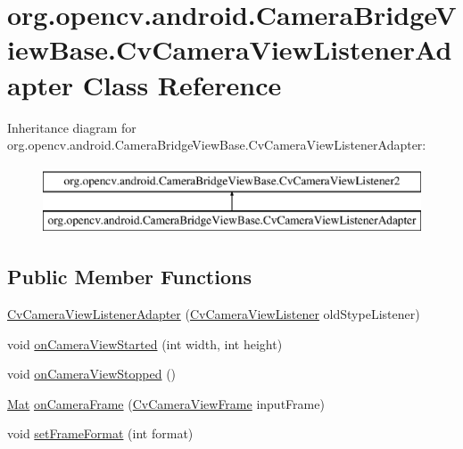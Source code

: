 \hypertarget{classorg_1_1opencv_1_1android_1_1_camera_bridge_view_base_1_1_cv_camera_view_listener_adapter}{}\section{org.\+opencv.\+android.\+Camera\+Bridge\+View\+Base.\+Cv\+Camera\+View\+Listener\+Adapter Class Reference}
\label{classorg_1_1opencv_1_1android_1_1_camera_bridge_view_base_1_1_cv_camera_view_listener_adapter}
Inheritance diagram for org.\+opencv.\+android.\+Camera\+Bridge\+View\+Base.\+Cv\+Camera\+View\+Listener\+Adapter\+:\begin{figure}[H]
\begin{center}
\leavevmode
\includegraphics[height=2.000000cm]{classorg_1_1opencv_1_1android_1_1_camera_bridge_view_base_1_1_cv_camera_view_listener_adapter}
\end{center}
\end{figure}
\subsection*{Public Member Functions}
\begin{DoxyCompactItemize}
\item 
\mbox{\hyperlink{classorg_1_1opencv_1_1android_1_1_camera_bridge_view_base_1_1_cv_camera_view_listener_adapter_ae7da6dbcb9eae36397b99a23194f1d0b}{Cv\+Camera\+View\+Listener\+Adapter}} (\mbox{\hyperlink{interfaceorg_1_1opencv_1_1android_1_1_camera_bridge_view_base_1_1_cv_camera_view_listener}{Cv\+Camera\+View\+Listener}} old\+Stype\+Listener)
\item 
void \mbox{\hyperlink{classorg_1_1opencv_1_1android_1_1_camera_bridge_view_base_1_1_cv_camera_view_listener_adapter_ac3c80b8f6b63af5c9f0e0239afb0ea92}{on\+Camera\+View\+Started}} (int width, int height)
\item 
void \mbox{\hyperlink{classorg_1_1opencv_1_1android_1_1_camera_bridge_view_base_1_1_cv_camera_view_listener_adapter_aadb52c2d31eddad60a8d5295f66fe76e}{on\+Camera\+View\+Stopped}} ()
\item 
\mbox{\hyperlink{classorg_1_1opencv_1_1core_1_1_mat}{Mat}} \mbox{\hyperlink{classorg_1_1opencv_1_1android_1_1_camera_bridge_view_base_1_1_cv_camera_view_listener_adapter_a8e7517c94e210a4bd3176ae681babc4b}{on\+Camera\+Frame}} (\mbox{\hyperlink{interfaceorg_1_1opencv_1_1android_1_1_camera_bridge_view_base_1_1_cv_camera_view_frame}{Cv\+Camera\+View\+Frame}} input\+Frame)
\item 
void \mbox{\hyperlink{classorg_1_1opencv_1_1android_1_1_camera_bridge_view_base_1_1_cv_camera_view_listener_adapter_a2e6b240e68884aff91670c5d98614180}{set\+Frame\+Format}} (int format)
\end{DoxyCompactItemize}


